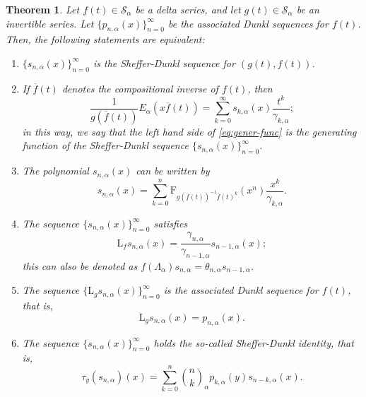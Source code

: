 \documentclass[11pt]{article}
\theoremstyle{plain}
\newtheorem{theorem}{Theorem}[section]
\theoremstyle{remark}
\numberwithin{equation}{section} %
\newcommand{\Ea}{E_{\alpha}}
\newcommand{\La}{\Lambda_{\alpha}}
\newcommand{\binoma}[2]{\binom{#1}{#2}_{\!\alpha}}
\newcommand{\Sa}{\mathcal{S}_{\alpha}}
\newcommand{\FF}{\mathrm{F}}
\newcommand{\LL}{\mathrm{L}}
\begin{document}
\begin{theorem}
\label{thm:charact} 
Let $f(t) \in \Sa$ be a delta series, and let $g(t) \in \Sa$ be an invertible series. Let $\{p_{n,\alpha}(x)\}_{n=0}^\infty$ be the associated Dunkl sequences for $f(t)$.
Then, the following statements are equivalent:
\begin{enumerate}
\item $\{s_{n,\alpha}(x)\}_{n=0}^{\infty}$ is the Sheffer-Dunkl sequence for $(g(t),f(t))$.
\item If $\overline{f}(t)$ denotes the compositional inverse of $f(t)$, then
\begin{equation}
\label{eq:gener-func}
\frac{1}{g(\overline{f}(t))}\Ea(x\overline{f}(t)) 
= \sum_{k=0}^{\infty} {s_{k,\alpha}(x)} \frac{t^k}{\gamma_{k,\alpha}};
\end{equation}
in this way, we say that the left hand side of \eqref{eq:gener-func} is the generating function of the Sheffer-Dunkl sequence $\{s_{n,\alpha}(x)\}_{n=0}^{\infty}$.
\item The polynomial $s_{n,\alpha}(x)$ can be written by 
\begin{equation}
\label{eq:s-expl}
s_{n,\alpha}(x) = \sum_{k=0}^n \FF_{g(\overline{f}(t))^{-1} \overline{f}(t)^k}(x^n) 
\frac{x^k}{\gamma_{k,\alpha}}.
\end{equation}
\item The sequence $\{s_{n,\alpha}(x)\}_{n=0}^{\infty}$ satisfies
\begin{equation*}
\LL_fs_{n,\alpha}(x) = \frac{\gamma_{n,\alpha}}{\gamma_{n-1,\alpha}}s_{n-1,\alpha}(x);
\end{equation*}
 this can also be denoted as $f(\La) s_{n,\alpha} = \theta_{n,\alpha} s_{n-1,\alpha}$.
\item The sequence $\{\LL_gs_{n,\alpha}(x)\}_{n=0}^{\infty}$ is the associated Dunkl sequence for $f(t)$, that is, 
\begin{equation}
\label{eq:g-aso}
\LL_g s_{n,\alpha}(x) = p_{n,\alpha}(x).
\end{equation}
\item 
The sequence $\{s_{n,\alpha}(x)\}_{n=0}^{\infty}$ holds the so-called Sheffer-Dunkl identity, that is,
\begin{equation}
\label{eq:ident-S}
\tau_y(s_{n,\alpha})(x) = \sum_{k=0}^{n} \binoma{n}{k} p_{k,\alpha}(y)s_{n-k,\alpha}(x).
\end{equation}
\end{enumerate}
\end{theorem}
\end{document}
